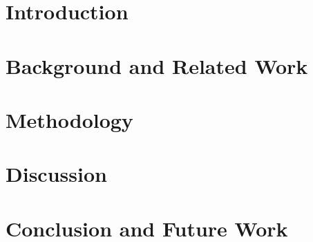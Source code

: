 \documentclass [11pt, proquest] {uwthesis}[2020/02/24]
\begin{document}
%
%
\tableofcontents
\listoffigures
\listoftables

 
%
%

%
%

%
 
 
 
%
%

\textpages
 
\chapter{Introduction}
\label{chap:introduction}


\chapter{Background and Related Work}
\label{chap:background}


\chapter{Methodology}
\label{chap:methodology}




\chapter{Discussion}
\label{chap:discussion}


\chapter{Conclusion and Future Work}
\label{chap:conclusion}


%
%
\nocite{*}   %


\end{document}
